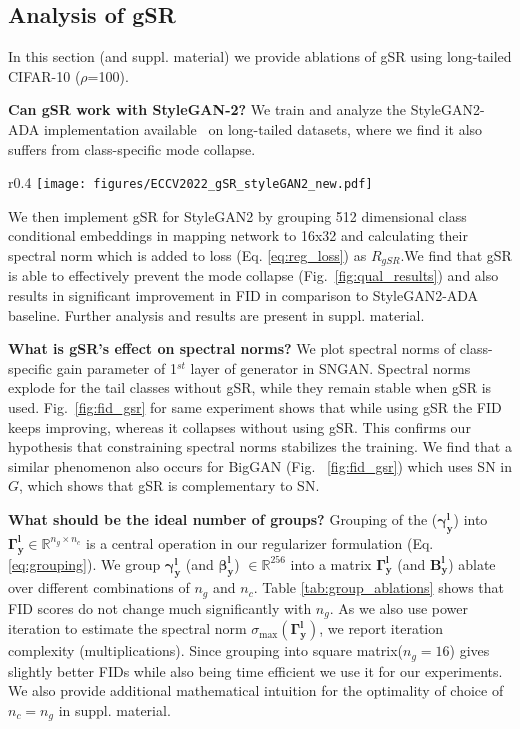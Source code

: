 \documentclass[runningheads,table]{llncs}
\begin{document}
\subsection{Analysis of gSR}
In this section (and suppl. material) we provide ablations of gSR using long-tailed CIFAR-10 ($\rho$=100).  

 \noindent \textbf{Can gSR work with StyleGAN-2?} We train and analyze the StyleGAN2-ADA implementation available~\cite{kang2020contrastive} on long-tailed datasets, where we find it also suffers from class-specific mode collapse.
 \setlength{\intextsep}{0pt}\begin{wrapfigure}{r}{0.4\textwidth}
    \texttt{[image: figures/ECCV2022\_gSR\_styleGAN2\_new.pdf]}
    \caption{\textbf{StyleGAN2-ADA}  On CIFAR-10 ($\rho = 100$), comparison of gSR with the baseline.}
    \label{fig:qual_results}
\end{wrapfigure} We then implement gSR for StyleGAN2 by grouping 512 dimensional class conditional embeddings in mapping network to 16x32 and calculating their spectral norm which is added to loss (Eq. \ref{eq:reg_loss}) as $R_{gSR}$.We find that gSR is able to effectively prevent the mode collapse (Fig.\ \ref{fig:qual_results}) and also results in significant improvement in FID in comparison to StyleGAN2-ADA baseline. Further analysis and results are present in suppl. material.
 
\noindent\textbf{What is gSR's effect on spectral norms?}  We plot spectral norms of class-specific gain parameter of 1$^{st}$ layer of generator in SNGAN. Spectral norms explode for the tail classes without gSR, while they remain stable when gSR is used. Fig.~\ref{fig:fid_gsr} for same experiment shows that while using gSR the FID keeps improving, whereas it collapses without using gSR.  This confirms our hypothesis that constraining spectral norms stabilizes the training. We find that a similar phenomenon also occurs for BigGAN (Fig. ~\ref{fig:fid_gsr}) which uses SN in $G$, which shows that gSR is complementary to SN.



\noindent\textbf{What should be the ideal number of groups?} Grouping of the ($\mathbf{\gamma^l_y}$) into $\mathbf{\Gamma^l_y} \in \mathbb{R}^{{n_g}\times{n_c}}$ is a central operation in our regularizer formulation (Eq. \ref{eq:grouping}). We group $\mathbf{\gamma^l_y}$ (and $\mathbf{\beta^l_y}$) $\in \mathbb{R}^{256}$ into a matrix $\mathbf{\Gamma^l_y}$ (and $\mathbf{B^l_y}$) ablate over different combinations of $n_g$ and $n_c$. Table \ref{tab:group_ablations} shows that FID scores do not change much significantly with $n_g$. As we also use power iteration to estimate the spectral norm $\sigma_{\max} (\mathbf{\Gamma^l_y})$, we report iteration complexity (multiplications). Since grouping into square matrix($n_g = 16$) gives slightly better FIDs while also being time efficient we use it for our experiments. We also provide additional mathematical intuition for the optimality of choice of $n_c = n_g$ in suppl. material. 
\end{document}
